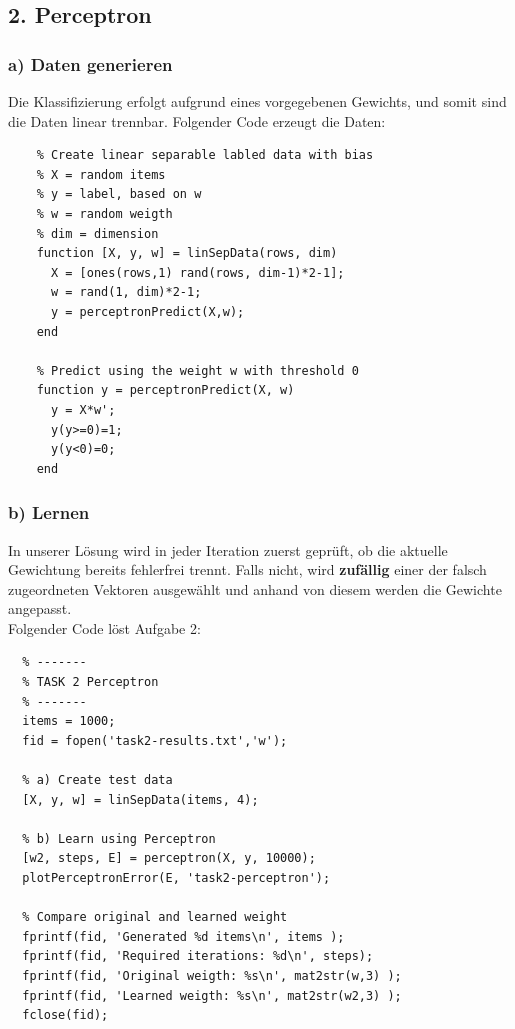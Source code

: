\documentclass{article}
\begin{document}
\subsection*{2. Perceptron}

\subsubsection*{a) Daten generieren}
	Die Klassifizierung erfolgt aufgrund eines vorgegebenen Gewichts, und somit sind die Daten linear trennbar. Folgender Code erzeugt die Daten:
	
	\begin{lstlisting}
	% Create linear separable labled data with bias
	% X = random items
	% y = label, based on w
	% w = random weigth
	% dim = dimension
	function [X, y, w] = linSepData(rows, dim)
	  X = [ones(rows,1) rand(rows, dim-1)*2-1];
	  w = rand(1, dim)*2-1;
	  y = perceptronPredict(X,w);
	end
	
	% Predict using the weight w with threshold 0
	function y = perceptronPredict(X, w)
	  y = X*w';
	  y(y>=0)=1;
	  y(y<0)=0;
	end
	\end{lstlisting}
	
	
\subsubsection*{b) Lernen}
	In unserer Lösung wird in jeder Iteration zuerst geprüft, ob die aktuelle Gewichtung bereits fehlerfrei trennt. Falls nicht, wird \textbf{zufällig} einer der falsch zugeordneten Vektoren ausgewählt und anhand von diesem werden die Gewichte angepasst.\\
	
	Folgender Code löst Aufgabe 2:
	\begin{lstlisting}
  % -------
  % TASK 2 Perceptron
  % -------
  items = 1000;
  fid = fopen('task2-results.txt','w');

  % a) Create test data
  [X, y, w] = linSepData(items, 4);
  
  % b) Learn using Perceptron
  [w2, steps, E] = perceptron(X, y, 10000);
  plotPerceptronError(E, 'task2-perceptron');

  % Compare original and learned weight
  fprintf(fid, 'Generated %d items\n', items );
  fprintf(fid, 'Required iterations: %d\n', steps);
  fprintf(fid, 'Original weigth: %s\n', mat2str(w,3) );
  fprintf(fid, 'Learned weigth: %s\n', mat2str(w2,3) );
  fclose(fid);
	\end{lstlisting}
	
\end{document}
